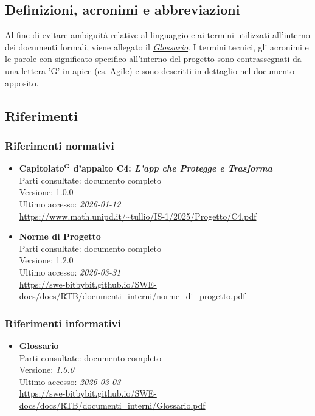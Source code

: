 \documentclass[a4paper,12pt]{article}
\newcommand{\term}[1]{\textbf{#1}$^\mathbf{G}$}
\begin{document}

\subsection{Definizioni, acronimi e abbreviazioni} \label{sec:definizioni_acronimi_abbreviazioni}

Al fine di evitare ambiguità relative al linguaggio e ai termini utilizzati all'interno dei documenti formali, viene allegato il \href{https://swe-bitbybit.github.io/SWE-docs/docs/RTB/documenti_interni/Glossario.pdf}{\textit{Glossario}}.
I termini tecnici, gli acronimi e le parole con significato specifico all'interno del progetto sono contrassegnati da una lettera 'G' in apice (es. Agile) e sono descritti in dettaglio nel documento apposito.


\subsection{Riferimenti} \label{sec:riferimenti}

\subsubsection{Riferimenti normativi}\label{sec:riferimenti_normativi}
\begin{itemize}
\item \textbf{\term{Capitolato} d'appalto C4: \emph{L'app che Protegge e Trasforma}}\\
Parti consultate: documento completo\\
Versione: 1.0.0\\
Ultimo accesso: \textit{2026-01-12}\\
\url{https://www.math.unipd.it/~tullio/IS-1/2025/Progetto/C4.pdf}

\item \textbf{Norme di Progetto}\\
Parti consultate: documento completo\\
Versione: 1.2.0\\
Ultimo accesso: \textit{2026-03-31}\\
\url{https://swe-bitbybit.github.io/SWE-docs/docs/RTB/documenti_interni/norme_di_progetto.pdf}
\end{itemize}


\subsubsection{Riferimenti informativi} \label{sec:riferimenti_informativi}
\begin{itemize}
    \item \textbf{Glossario}\\
        Parti consultate: documento completo\\
        Versione: \textit{1.0.0}\\
        Ultimo accesso: \textit{2026-03-03}\\
        \url{https://swe-bitbybit.github.io/SWE-docs/docs/RTB/documenti_interni/Glossario.pdf}
\end{itemize}
\end{document}
